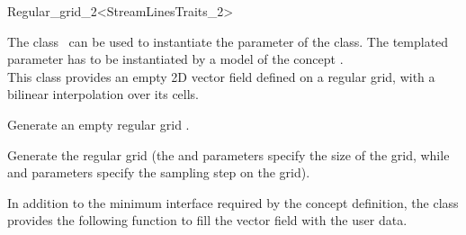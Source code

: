 

\begin{ccRefClass}{Regular_grid_2<StreamLinesTraits_2>}  %

\ccDefinition
  
The class \ccRefName\ can be used to instantiate the  parameter of
the  class.  The templated parameter  has to be
instantiated by a model of the concept .\\
This class provides an empty 2D vector field defined on a regular
grid, with a bilinear interpolation over its cells.

\ccCreation
{}  %

\ccThreeToTwo
{}
{Generate an empty regular grid \ccVar.}

\ccThreeToTwo
{}
{Generate the regular grid \ccVar (the  and  parameters specify the size of the grid, while  and  parameters specify the sampling step on the grid).}

In addition to the minimum interface required by the concept
definition, the class \ccRefName  provides the following function to
fill the vector field with the user data.




\ccIsModel 

 \\

\ccSeeAlso
{} \\
\end{ccRefClass}


